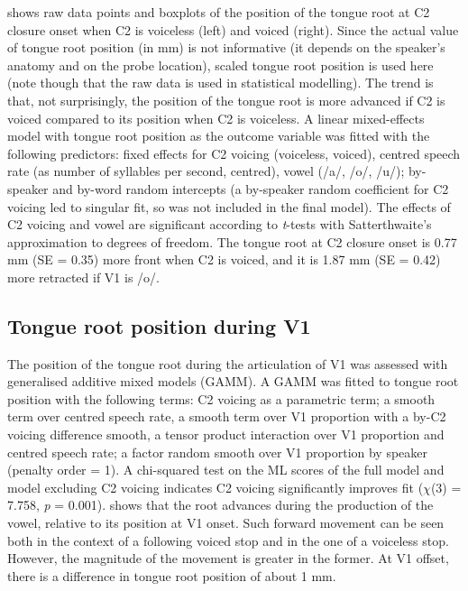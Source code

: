 \documentclass[12pt,]{article}
\begin{document}
 shows raw data points and boxplots of the position of
the tongue root at C2 closure onset when C2 is voiceless (left) and
voiced (right). Since the actual value of tongue root position (in mm)
is not informative (it depends on the speaker's anatomy and on the probe
location), scaled tongue root position is used here (note though that
the raw data is used in statistical modelling). The trend is that, not
surprisingly, the position of the tongue root is more advanced if C2 is
voiced compared to its position when C2 is voiceless. A linear
mixed-effects model with tongue root position as the outcome variable
was fitted with the following predictors: fixed effects for C2 voicing
(voiceless, voiced), centred speech rate (as number of syllables per
second, centred), vowel (/a/, /o/, /u/); by-speaker and by-word random
intercepts (a by-speaker random coefficient for C2 voicing led to
singular fit, so was not included in the final model). The effects of C2
voicing and vowel are significant according to \emph{t}-tests with
Satterthwaite's approximation to degrees of freedom. The tongue root at
C2 closure onset is 0.77 mm (SE = 0.35) more front when C2 is voiced,
and it is 1.87 mm (SE = 0.42) more retracted if V1 is /o/.

\hypertarget{tongue-root-position-during-v1}{%
\subsection{Tongue root position during
V1}\label{tongue-root-position-during-v1}}

\label{s:trp-v1}

The position of the tongue root during the articulation of V1 was
assessed with generalised additive mixed models (GAMM). A GAMM was
fitted to tongue root position with the following terms: C2 voicing as a
parametric term; a smooth term over centred speech rate, a smooth term
over V1 proportion with a by-C2 voicing difference smooth, a tensor
product interaction over V1 proportion and centred speech rate; a factor
random smooth over V1 proportion by speaker (penalty order = 1). A
chi-squared test on the ML scores of the full model and model excluding
C2 voicing indicates C2 voicing significantly improves fit (\(\chi\)(3)
= 7.758, \emph{p} = 0.001).  shows that the root
advances during the production of the vowel, relative to its position at
V1 onset. Such forward movement can be seen both in the context of a
following voiced stop and in the one of a voiceless stop. However, the
magnitude of the movement is greater in the former. At V1 offset, there
is a difference in tongue root position of about 1 mm.
\end{document}
